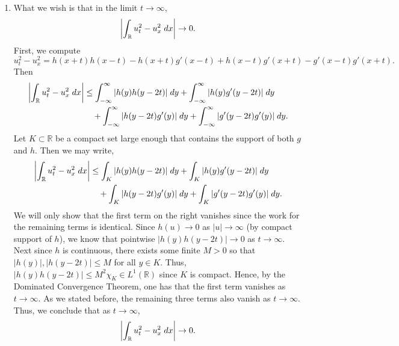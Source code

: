 \documentclass{article}
\begin{document}
\begin{enumerate}[itemsep =-2pt,label = (\roman{*})]
		where there is no boundary term since $u_x, u_t$ are supported inside $K_T$. So we have shown that $\dot{e}(t) = 0$ for all $0 \leq t \leq T$. Since $T > 0$ was chosen arbitrarily, it follows that $\dot{e}(t)\equiv 0$. Therefore, the total energy is constant in $t$. 
		\item What we wish is that in the limit $t \to \infty$, 
		\begin{equation*}
			\left| \int_{\mathbb{R}}u_t^2 - u_x^2\;dx \right| \to 0. 
		\end{equation*}
		First, we compute 
		\begin{equation*}
			u_t^2 - u_x^2 = h(x + t)h(x - t) - h(x + t)g'(x - t) + h(x - t)g'(x + t) - g'(x - t)g'(x + t). 
		\end{equation*}
		Then 
		\begin{align*}
			\begin{split}
				\left| \int_{\mathbb{R}}u_t^2 - u_x^2\;dx \right| &\leq \int_{-\infty}^{\infty}|h(y)h(y - 2t)|\;dy + \int_{-\infty}^{\infty}|h(y)g'(y - 2t)|\;dy \\
				&\quad+ \int_{-\infty}^{\infty}|h(y - 2t)g'(y)|\;dy + \int_{-\infty}^{\infty}|g'(y - 2t)g'(y)|\;dy.
			\end{split}
		\end{align*}
		Let $K \subset \mathbb{R}$ be a compact set large enough that contains the support of both $g$ and $h$. Then we may write, 
		\begin{align*}
			\begin{split}
				\left| \int_{\mathbb{R}}u_t^2 - u_x^2\;dx \right| &\leq \int_{K}|h(y)h(y - 2t)|\;dy + \int_{K}|h(y)g'(y - 2t)|\;dy \\
				&\quad+ \int_{K}|h(y - 2t)g'(y)|\;dy + \int_{K}|g'(y - 2t)g'(y)|\;dy.
			\end{split}
		\end{align*}
		We will only show that the first term on the right vanishes since the work for the remaining terms is identical. Since $h(u) \to 0$ as $|u| \to \infty$ (by compact support of $h$), we know that pointwise $|h(y)h(y - 2t)| \to 0$ as $t \to \infty$. Next since $h$ is continuous, there exists some finite $M > 0$ so that $|h(y)|, |h(y - 2t)| \leq M$ for all $y \in K$. Thus, $|h(y)h(y-2t)| \leq M^2\chi_{K} \in L^1(\mathbb{R})$ since $K$ is compact. Hence, by the Dominated Convergence Theorem, one has that the first term vanishes as $t \to \infty$. As we stated before, the remaining three terms also vanish as $t \to \infty$. Thus, we conclude that as $t \to \infty$,
		\begin{equation*}
			\left| \int_{\mathbb{R}}u_t^2 - u_x^2\;dx \right| \to 0. 
		\end{equation*}
	\end{enumerate}
	
\end{document}
